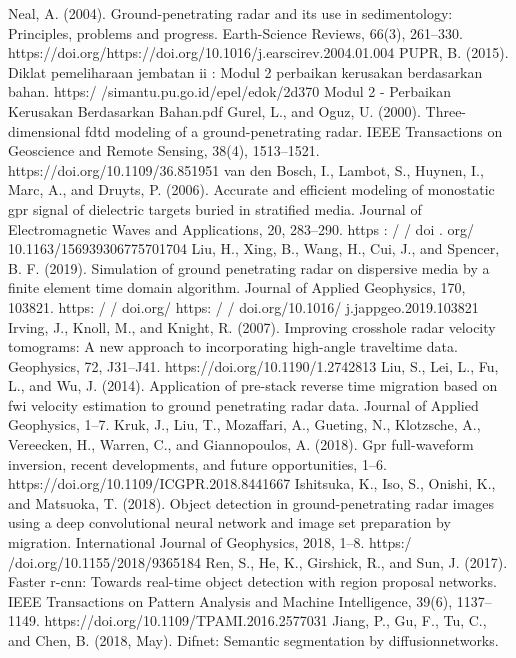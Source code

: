 \documentclass[conference]{IEEEtran}
\begin{document}
\begin{thebibliography}{00}
 Neal, A. (2004). Ground-penetrating radar and its use in sedimentology: Principles, problems and progress. Earth-Science Reviews, 66(3), 261–330. https://doi.org/https://doi.org/10.1016/j.earscirev.2004.01.004
 PUPR, B. (2015). Diklat pemeliharaan jembatan ii : Modul 2 perbaikan kerusakan berdasarkan bahan. https:/ /simantu.pu.go.id/epel/edok/2d370 Modul 2 - Perbaikan Kerusakan Berdasarkan Bahan.pdf
 Gurel, L., and Oguz, U. (2000). Three-dimensional fdtd modeling of a ground-penetrating radar. IEEE Transactions on Geoscience and Remote Sensing, 38(4), 1513–1521. https://doi.org/10.1109/36.851951
 van den Bosch, I., Lambot, S., Huynen, I., Marc, A., and Druyts, P. (2006). Accurate and efficient modeling of monostatic gpr signal of dielectric targets buried in stratified media. Journal of Electromagnetic Waves and Applications, 20, 283–290. https : / / doi . org/ 10.1163/156939306775701704
 Liu, H., Xing, B., Wang, H., Cui, J., and Spencer, B. F. (2019). Simulation of ground penetrating radar on dispersive media by a finite element time domain algorithm. Journal of Applied Geophysics, 170, 103821. https: / / doi.org/ https: / / doi.org/10.1016/ j.jappgeo.2019.103821
 Irving, J., Knoll, M., and Knight, R. (2007). Improving crosshole radar velocity tomograms: A new approach to incorporating high-angle traveltime data. Geophysics, 72, J31–J41. https://doi.org/10.1190/1.2742813
 Liu, S., Lei, L., Fu, L., and Wu, J. (2014). Application of pre-stack reverse time migration based on fwi velocity estimation to ground penetrating radar data. Journal of Applied Geophysics, 1–7.
 Kruk, J., Liu, T., Mozaffari, A., Gueting, N., Klotzsche, A., Vereecken, H., Warren, C., and Giannopoulos, A. (2018). Gpr full-waveform inversion, recent developments, and future opportunities, 1–6. https://doi.org/10.1109/ICGPR.2018.8441667
 Ishitsuka, K., Iso, S., Onishi, K., and Matsuoka, T. (2018). Object detection in ground-penetrating radar images using a deep convolutional neural network and image set preparation by migration. International Journal of Geophysics, 2018, 1–8. https:/ /doi.org/10.1155/2018/9365184
 Ren, S., He, K., Girshick, R., and Sun, J. (2017). Faster r-cnn: Towards real-time object detection with region proposal networks. IEEE Transactions on Pattern Analysis and Machine Intelligence, 39(6), 1137–1149. https://doi.org/10.1109/TPAMI.2016.2577031
 Jiang, P., Gu, F., Tu, C., and Chen, B. (2018, May). Difnet: Semantic segmentation by diffusionnetworks.

\end{thebibliography}
\end{document}
